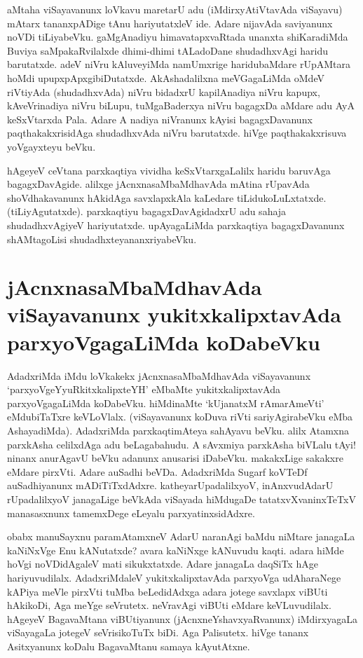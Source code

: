aMtaha viSayavanunx loVkavu maretarU adu (iMdirxyAtiVtavAda viSayavu) mAtarx tananxpADige tAnu hariyutatxleV ide. Adare nijavAda saviyanunx noVDi tiLiyabeVku. gaMgAnadiyu himavatapxvaRtada unanxta shiKaradiMda Buviya saMpakaRvilalxde dhimi-dhimi tALadoDane shudadhxvAgi haridu barutatxde. adeV niVru kAluveyiMda namUmxrige haridubaMdare rUpAMtara hoMdi upupxpApxgibiDutatxde. AkAshadalilxna meVGagaLiMda oMdeV riVtiyAda (shudadhxvAda) niVru bidadxrU kapilAnadiya niVru kapupx, kAveVrinadiya niVru biLupu, tuMgaBaderxya niVru bagagxDa aMdare adu AyA keSxVtarxda Pala. Adare A nadiya niVranunx kAyisi bagagxDavanunx paqthakakxrisidAga shudadhxvAda niVru barutatxde. hiVge paqthakakxrisuva yoVgayxteyu beVku.

hAgeyeV ceVtana parxkaqtiya vividha keSxVtarxgaLalilx haridu baruvAga bagagxDavAgide. alilxge jAcnxnasaMbaMdhavAda mAtina rUpavAda shoVdhakavanunx hAkidAga savxlapxkAla kaLedare tiLidukoLuLxtatxde. (tiLiyAgutatxde). parxkaqtiyu bagagxDavAgidadxrU adu sahaja shudadhxvAgiyeV hariyutatxde. upAyagaLiMda parxkaqtiya bagagxDavanunx shAMtagoLisi shudadhxteyananxriyabeVku.

\section*{jAcnxnasaMbaMdhavAda viSayavanunx yukitxkalipxtavAda parxyoVgagaLiMda koDabeVku}

AdadxriMda iMdu loVkakekx jAcnxnasaMbaMdhavAda viSayavanunx `parxyoVgeYyuRkitxkalipxteYH'\label{136a} eMbaMte yukitxkalipxtavAda parxyoVgagaLiMda koDabeVku. hiMdinaMte `kUjanatxM rAmarAmeVti'\label{136} eMdubiTaTxre keVLoVlalx. (viSayavanunx koDuva riVti sariyAgirabeVku eMba AshayadiMda). AdadxriMda parxkaqtimAteya sahAyavu beVku. alilx Atamxna parxkAsha celilxdAga adu beLagabahudu. A sAvxmiya parxkAsha biVLalu tAyi! ninanx anurAgavU beVku adanunx anusarisi iDabeVku. makakxLige sakakxre eMdare pirxVti. Adare auSadhi beVDa. AdadxriMda Sugarf koVTeDf auSadhiyanunx mADiTiTxdAdxre. katheyarUpadalilxyoV, inAnxvudAdarU rUpadalilxyoV janagaLige beVkAda viSayada hiMdugaDe tatatxvXvaninxTeTxV manasasxnunx tamemxDege eLeyalu parxyatinxsidAdxre.

obabx manuSayxnu paramAtamxneV AdarU naranAgi baMdu niMtare janagaLa kaNiNxVge Enu kANutatxde? avara kaNiNxge kANuvudu kaqti. adara hiMde hoVgi noVDidAgaleV mati sikukxtatxde. Adare janagaLa daqSiTx hAge hariyuvudilalx. AdadxriMdaleV yukitxkalipxtavAda parxyoVga udAharaNege kAPiya meVle pirxVti tuMba beLedidAdxga adara jotege savxlapx viBUti hAkikoDi, Aga meYge seVrutetx. neVravAgi viBUti eMdare keVLuvudilalx. hAgeyeV BagavaMtana viBUtiyanunx (jAcnxneYshavxyaRvanunx) iMdirxyagaLa viSayagaLa jotegeV seVrisikoTuTx biDi. Aga Palisutetx. hiVge tananx Asitxyanunx koDalu BagavaMtanu samaya kAyutAtxne.

